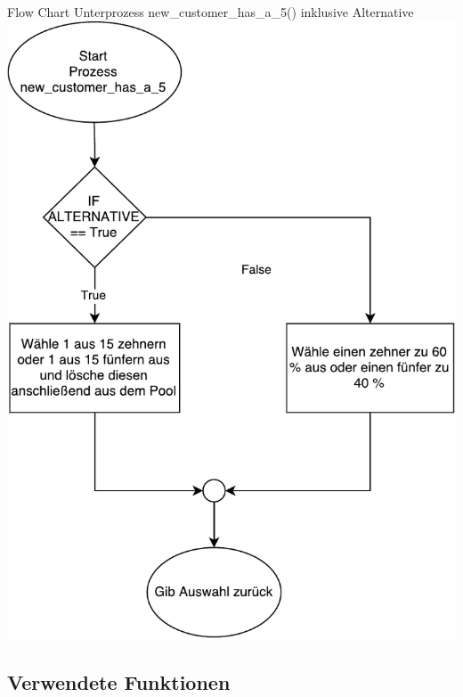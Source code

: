 \begin{frame}{Flow Chart Unterprozess new\_customer\_has\_a\_5() inklusive Alternative}
	\centering
  	\includegraphics[scale=0.3]{BSP18_Flow_Chart_3.pdf}
\end{frame}


\subsection{Verwendete Funktionen}
%
%




